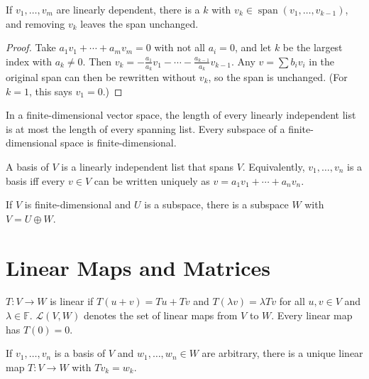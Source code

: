 \begin{theorem}
If $v_1,\ldots,v_m$ are linearly dependent, there is a $k$ with $v_k\in\operatorname{span}(v_1,\ldots,v_{k-1})$, and removing $v_k$ leaves the span unchanged.
\end{theorem}
\begin{proof}
Take $a_1v_1+\cdots+a_mv_m = 0$ with not all $a_i = 0$, and let $k$ be the largest index with $a_k\neq0$. Then $v_k = -\frac{a_1}{a_k}v_1-\cdots-\frac{a_{k-1}}{a_k}v_{k-1}$. Any $v = \sum b_iv_i$ in the original span can then be rewritten without $v_k$, so the span is unchanged. (For $k=1$, this says $v_1 = 0$.)
\end{proof}

\begin{theorem}
In a finite-dimensional vector space, the length of every linearly independent list is at most the length of every spanning list. Every subspace of a finite-dimensional space is finite-dimensional.
\end{theorem}

\begin{definition}[Basis]
A basis of $V$ is a linearly independent list that spans $V$. Equivalently, $v_1,\ldots,v_n$ is a basis iff every $v\in V$ can be written uniquely as $v = a_1v_1+\cdots+a_nv_n$.
\end{definition}

\begin{theorem}
If $V$ is finite-dimensional and $U$ is a subspace, there is a subspace $W$ with $V = U\oplus W$.
\end{theorem}

\section{Linear Maps and Matrices}

\begin{definition}
$T:V\to W$ is linear if $T(u+v) = Tu+Tv$ and $T(\lambda v) = \lambda Tv$ for all $u,v\in V$ and $\lambda\in\mathbb{F}$. $\mathcal{L}(V,W)$ denotes the set of linear maps from $V$ to $W$. Every linear map has $T(0) = 0$.
\end{definition}

\begin{theorem}
If $v_1,\ldots,v_n$ is a basis of $V$ and $w_1,\ldots,w_n\in W$ are arbitrary, there is a unique linear map $T:V\to W$ with $Tv_k = w_k$.
\end{theorem}

